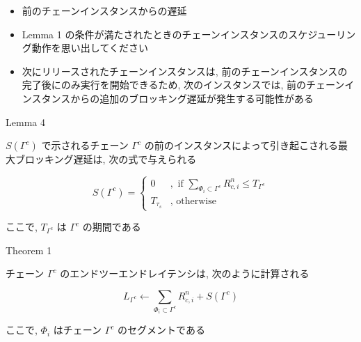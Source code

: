 \begin{frame}{}
    \begin{itemize}
        \item 前のチェーンインスタンスからの遅延
        \item Lemma 1 の条件が満たされたときのチェーンインスタンスのスケジューリング動作を思い出してください
        \item 次にリリースされたチェーンインスタンスは, 前のチェーンインスタンスの完了後にのみ実行を開始できるため, 次のインスタンスでは, 前のチェーンインスタンスからの追加のブロッキング遅延が発生する可能性がある
    \end{itemize}
\end{frame}

\begin{frame}[label=lemma4]{Lemma 4}
    \begin{lemma}[]
        $S\left(\Gamma^{c}\right)$ で示されるチェーン $\Gamma^{c}$ の前のインスタンスによって引き起こされる最大ブロッキング遅延は, 次の式で与えられる

        \begin{equation*}
            S\left(\Gamma^{c}\right)= \begin{cases}0 &, \text { if } \sum_{\Phi_{i} \subset \Gamma^{c}} R_{c, i}^{n} \leq T_{\Gamma^{c}} \\ T_{\tau_{s}} &, \text { otherwise }\end{cases}
        \end{equation*}

        ここで, $T_{\Gamma^{c}}$ は $\Gamma^{c}$ の期間である
    \end{lemma}
\end{frame}

\begin{frame}[label=theorem1]{Theorem 1}
    \begin{theorem}[]
        チェーン $\Gamma^{c}$ のエンドツーエンドレイテンシは, 次のように計算される

        \begin{equation*}
            L_{\Gamma^{c}} \leftarrow \sum_{\Phi_{i} \subset \Gamma^{c}} R_{c, i}^{n}+S\left(\Gamma^{c}\right)
        \end{equation*}

        ここで, $\Phi_{i}$ はチェーン $\Gamma^{c}$ のセグメントである
    \end{theorem}
\end{frame}
